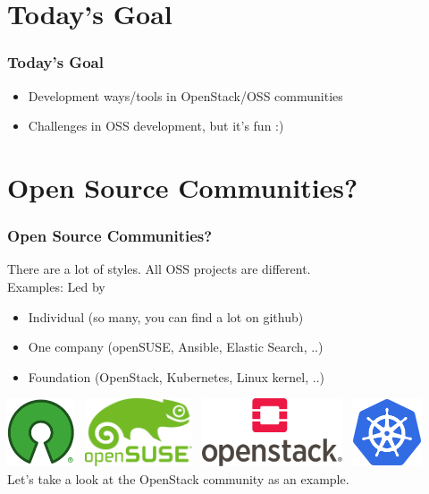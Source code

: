 \documentclass[aspectratio=169,11pt,hyperref={colorlinks=true}]{beamer}
\begin{document}
\section{Today's Goal}
\begin{frame}
  \frametitle{Today's Goal}
  \begin{itemize}
    \item Development ways/tools in OpenStack/OSS communities
    \item Challenges in OSS development, but it's fun :)
  \end{itemize}
\end{frame}

\section{Open Source Communities?}
\begin{frame}
  \frametitle{Open Source Communities?}
  There are a lot of styles. All OSS projects are different.\\
  Examples: Led by
  \begin{itemize}
    \item Individual (so many, you can find a lot on github)
    \item One company (openSUSE, Ansible, Elastic Search, ..)
    \item Foundation (OpenStack, Kubernetes, Linux kernel, ..)
  \end{itemize}
  \includegraphics[height=20mm]{images/osi-keyhole.png}~
  \includegraphics[height=20mm]{images/openSUSE-logo.png}~
  \includegraphics[height=20mm]{images/openstack-logo.png}~
  \includegraphics[height=20mm]{images/kubernetes-logo.png}
  \\
  Let's take a look at the OpenStack community as an example.
\end{frame}
\end{document}
